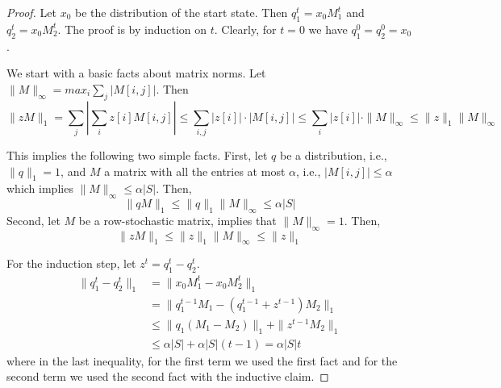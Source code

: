 \begin{proof}
Let $x_0$ be the distribution of the start state. Then $q_1^t=x_0
M_1^t$ and $q_2^t=x_0 M_2^t$. The proof is by induction on $t$.
Clearly, for $t=0$ we have $q_1^0=q_2^0=x_0$.

We start with a  basic facts about matrix norms.
Let $\|M\|_\infty = max_i \sum_j |M[i,j]|$. Then
\begin{equation}
\label{eq_norm_matrix_1}
\| z M\|_1 = \sum_j | \sum_i z[i] M[i,j]|\leq \sum_{i,j} |z[i]| \cdot |M[i,j] | \leq \sum_i |z[i]| \cdot \|M\|_\infty \leq \|z\|_1 \|M\|_\infty
\end{equation}

This implies the following two simple facts.
First, let $q$ be a
distribution, i.e., $\|q\|_1=1$, and $M$ a matrix with all the entries at most $\alpha$,
i.e., $|M[i,j]|\leq\alpha$ which implies $\|M\|_\infty \leq \alpha |S|$. Then,
\begin{equation}
\label{eq_norm_matrix_qM}
\|qM\|_1 \leq \|q\|_1 \|M\|_\infty
 \leq \alpha|S|
\end{equation}
Second, let $M$ be a row-stochastic matrix,  implies that $\|M\|_\infty=1$. Then,
\begin{equation}
\label{eq_norm_matrix_zM}
\|zM\|_1 \leq \|z\|_1 \|M\|_\infty \leq \|z\|_1
\end{equation}

For the induction step, let $z^t=q_1^t-q_2^t$.
\begin{align*}
\|q_1^t-q_2^t\|_1 &= \|x_0M_1^t-x_0M_2^t\|_1\\
&= \|q_1^{t-1}M_1 - (q_1^{t-1}+z^{t-1})M_2\|_1\\
&\leq \|q_1 (M_1-M_2)\|_1 + \|z^{t-1}M_2\|_1\\
&\leq \alpha|S| + \alpha |S|(t-1) = \alpha|S|t
\end{align*}
where in the last inequality, for the first term we used the first
fact and for the second term we used the second fact with the
inductive claim.
\end{proof}


